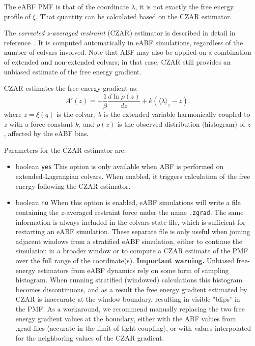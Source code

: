 The eABF PMF is that of the coordinate $\lambda$, it is not exactly the free energy profile of $\xi$.
That quantity can be calculated based on  the CZAR
estimator.



The \emph{corrected z-averaged restraint} (CZAR) estimator
is described in detail in reference~\cite{Lesage2017}.
It is computed automatically in eABF simulations,
regardless of the number of colvars involved.
Note that ABF may also be applied on a combination of extended and non-extended
colvars; in that case, CZAR still provides an unbiased estimate of the free energy gradient.

CZAR estimates the free energy gradient as:
\begin{equation}
A'(z) = - \frac{1}{\beta} \frac{d\ln  \tilde \rho (z)}{dz}  + k (\langle\lambda\rangle_z - z).
\label{eq:czar}
\end{equation}
where $z=\xi(q)$ is the colvar, $\lambda$ is the extended variable harmonically
coupled to $z$ with a force constant $k$, and $\tilde\rho (z)$ is the observed
distribution (histogram) of $z$, affected by the eABF bias.

Parameters for the CZAR estimator are:
\begin{itemize}
 \item {}
  {boolean}
  {\texttt{yes}}
{This option is only available when ABF is performed on extended-Lagrangian colvars.
When enabled, it triggers calculation of the free energy following the CZAR estimator.}

 \item {}
  {boolean}
  {\texttt{no}}
{When this option is enabled, eABF simulations will write a file containing the
$z$-averaged restraint force under the name \outputName\texttt{.zgrad}.
The same information is always included in the colvars state file, which is sufficient
for restarting an eABF simulation.
These separate file is only useful when joining adjacent windows from a stratified
eABF simulation, either to continue the simulation in a broader window or to
compute a CZAR estimate of the PMF over the full range of the coordinate(s).
\textbf{Important warning.} Unbiased free-energy estimators from eABF dynamics rely
on some form of sampling histogram. When running stratified (windowed) calculations
this histogram becomes discontinuous, and as a result the free energy gradient estimated
by CZAR is inaccurate at the window boundary, resulting in visible "blips" in the PMF.
As a workaround, we recommend manually replacing the two
free energy gradient values at the boundary, either with the ABF values from .grad files
(accurate in the limit of tight coupling), or with values interpolated for the neighboring
values of the CZAR gradient.
}
\end{itemize}

